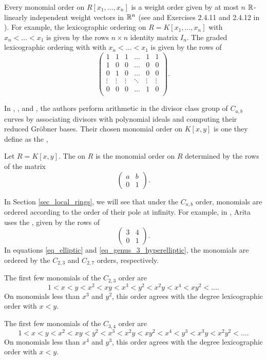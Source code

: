 Every monomial order on $R[x_1, \ldots, x_n]$ is a weight order given by at most $n$ $\mathbb{R}$-linearly independent weight vectors in $\mathbb{R}^n$
(see \cite{robbiano86} and Exercises 2.4.11 and 2.4.12 in \cite{cox07}).
For example, the lexicographic ordering on $R = K[x_1, \ldots, x_n]$ with $x_n < \dots < x_1$ is given by the rows $n \times n$ identity matrix $I_n$.
The graded lexicographic ordering with with $x_n < \dots < x_1$ is given by the rows of
  \[ \begin{pmatrix}
       1 & 1 & 1 & \dots & 1 & 1 \\
       1 & 0 & 0 & \dots & 0 & 0 \\
       0 & 1 & 0 & \dots & 0 & 0 \\
       \vdots & \vdots & \vdots & \ddots & \vdots & \vdots \\
       0 & 0 & 0 & \dots & 1 & 0 \\
     \end{pmatrix}. \]

In \cite{arita99}, \cite{arita03-1}, and \cite{harasawa00}, the authors perform arithmetic in the divisor class group of $C_{a,b}$ curves
by associating divisors with polynomial ideals and computing their reduced Gr\"obner bases.
Their chosen monomial order on $K[x,y]$ is one they define as the ,
\begin{definition}
  \label{def_cab_order}
  Let $R = K[x,y]$.
  The  on $R$ is the monomial order on $R$ determined by the rows of the matrix
  \[ \begin{pmatrix} a & b \\ 0 & 1 \end{pmatrix}. \]
\end{definition}
In Section \ref{sec_local_rings}, we will see that under the $C_{a,b}$ order,
monomials are ordered according to the order of their pole at infinity.
For example, in \cite{arita05-2}, Arita uses the ,
given by the rows of
\[ \begin{pmatrix} 3 & 4 \\ 0 & 1 \end{pmatrix}. \]
In equations \ref{eq_elliptic} and \ref{eq_genus_3_hyperelliptic},
the monomials are ordered by the $C_{2,3}$ and $C_{2,7}$ orders, respectively.

\begin{example}
  \label{ex_c23_order}
  The first few monomials of the $C_{2,3}$ order are
  \[ 1 < x < y < x^2 < xy < x^3 < y^2 < x^2y < x^4 < xy^2 < \dots. \]
  On monomials less than $x^3$ and $y^2$,
  this order agrees with the degree lexicographic order with $x < y$.
\end{example}
\begin{example}
  \label{ex_c34_order}
  The first few monomials of the $C_{3,4}$ order are
  \[ 1 < x < y < x^2 < xy < y^2 < x^3 < x^2y < xy^2 < x^4 < y^3 < x^3y < x^2y^2 < \dots. \]
  On monomials less than $x^4$ and $y^3$,
  this order agrees with the degree lexicographic order with $x < y$.
\end{example}



